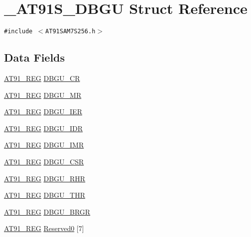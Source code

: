 \hypertarget{struct__AT91S__DBGU}{
\section{\_\-AT91S\_\-DBGU Struct Reference}
\label{struct__AT91S__DBGU}
}
{\tt \#include $<$AT91SAM7S256.h$>$}

\subsection*{Data Fields}
\begin{CompactItemize}
\item 
\hyperlink{AT91SAM7X256_8h_712ad5a1ac1bd02f3e95a7526c283ce1}{AT91\_\-REG} \hyperlink{struct__AT91S__DBGU_c0ec2f327fe14ffd3d8713273ac9a297}{DBGU\_\-CR}
\item 
\hyperlink{AT91SAM7X256_8h_712ad5a1ac1bd02f3e95a7526c283ce1}{AT91\_\-REG} \hyperlink{struct__AT91S__DBGU_6a42e275e70b1489101ce27630a163d3}{DBGU\_\-MR}
\item 
\hyperlink{AT91SAM7X256_8h_712ad5a1ac1bd02f3e95a7526c283ce1}{AT91\_\-REG} \hyperlink{struct__AT91S__DBGU_505e9f99d4497c2731ec97c61e75987b}{DBGU\_\-IER}
\item 
\hyperlink{AT91SAM7X256_8h_712ad5a1ac1bd02f3e95a7526c283ce1}{AT91\_\-REG} \hyperlink{struct__AT91S__DBGU_f059becb6730b21339608a53635c78f5}{DBGU\_\-IDR}
\item 
\hyperlink{AT91SAM7X256_8h_712ad5a1ac1bd02f3e95a7526c283ce1}{AT91\_\-REG} \hyperlink{struct__AT91S__DBGU_1a30016762e6cf6a1c2d7558b1092f3e}{DBGU\_\-IMR}
\item 
\hyperlink{AT91SAM7X256_8h_712ad5a1ac1bd02f3e95a7526c283ce1}{AT91\_\-REG} \hyperlink{struct__AT91S__DBGU_bb7191eb0dbf277a2c112a49d6100b6b}{DBGU\_\-CSR}
\item 
\hyperlink{AT91SAM7X256_8h_712ad5a1ac1bd02f3e95a7526c283ce1}{AT91\_\-REG} \hyperlink{struct__AT91S__DBGU_b09ba0a9de6924c76075026b2cd29b15}{DBGU\_\-RHR}
\item 
\hyperlink{AT91SAM7X256_8h_712ad5a1ac1bd02f3e95a7526c283ce1}{AT91\_\-REG} \hyperlink{struct__AT91S__DBGU_c541e251a8f6e42eddba11eea5c837b9}{DBGU\_\-THR}
\item 
\hyperlink{AT91SAM7X256_8h_712ad5a1ac1bd02f3e95a7526c283ce1}{AT91\_\-REG} \hyperlink{struct__AT91S__DBGU_dc2d66a9b251e35fc29fc3989c3de30a}{DBGU\_\-BRGR}
\item 
\hyperlink{AT91SAM7X256_8h_712ad5a1ac1bd02f3e95a7526c283ce1}{AT91\_\-REG} \hyperlink{struct__AT91S__DBGU_255e0adaab84068d3bdf2540d73e8743}{Reserved0} \mbox{[}7\mbox{]}

\end{CompactItemize}
